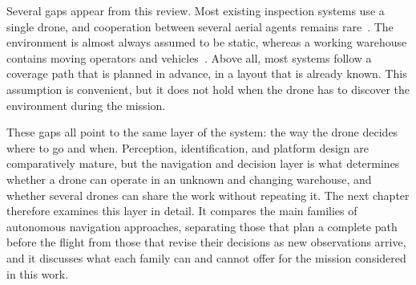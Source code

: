 Several gaps appear from this review. Most existing inspection systems use a
single drone, and cooperation between several aerial agents remains
rare~\cite{pore2026drone}. The environment is almost always assumed to be
static, whereas a working warehouse contains moving operators and
vehicles~\cite{pore2026drone}. Above all, most systems follow a coverage path
that is planned in advance, in a layout that is already known. This assumption
is convenient, but it does not hold when the drone has to discover the
environment during the mission.

These gaps all point to the same layer of the system: the way the drone decides
where to go and when. Perception, identification, and platform design are
comparatively mature, but the navigation and decision layer is what determines
whether a drone can operate in an unknown and changing warehouse, and whether
several drones can share the work without repeating it. The next chapter
therefore examines this layer in detail. It compares the main families of
autonomous navigation approaches, separating those that plan a complete path
before the flight from those that revise their decisions as new observations
arrive, and it discusses what each family can and cannot offer for the mission
considered in this work.
